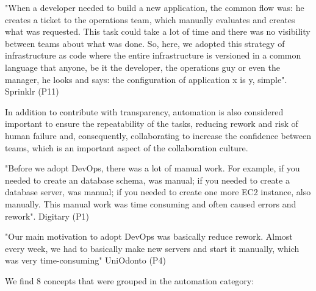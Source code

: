 "When a developer needed to build a new application, the common flow was: he creates a ticket to the operations team, which manually evaluates and creates what was requested. This task could take a lot of time and there was no visibility between teams about what was done. So, here, we adopted this strategy of infrastructure as code where the entire infrastructure is versioned in a common language that anyone, be it the developer, the operations guy or even the manager, he looks and says: the configuration of application x is y, simple". Sprinklr (P11)

In addition to contribute with transparency, automation is also considered important to ensure the repeatability of the tasks, reducing rework and risk of human failure and, consequently, collaborating to increase the confidence between teams, which is an important aspect of the collaboration culture.

"Before we adopt DevOps, there was a lot of manual work. For example, if you needed to create an database schema, was manual; if you needed to create a database server, was manual; if you needed to create one more EC2 instance, also manually. This manual work was time consuming and often caused errors and rework". Digitary (P1)

"Our main motivation to adopt DevOps was basically reduce rework. Almost every week, we had to basically make new servers and start it manually, which was very time-consuming" UniOdonto (P4)

We find 8 concepts that were grouped in the automation category:

